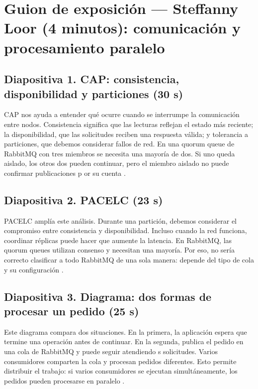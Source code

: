 
\section*{Guion de exposición — Steffanny Loor (4 minutos): comunicación y procesamiento paralelo}

\subsection*{Diapositiva 1. CAP: consistencia, disponibilidad y particiones (30 s)}
CAP nos ayuda a entender qué ocurre cuando se interrumpe la comunicación entre nodos.
Consistencia significa que las lecturas reflejan el estado más reciente;
la disponibilidad, que las solicitudes reciben una respuesta válida;
y tolerancia a particiones, que debemos considerar fallos de red.
 En una quorum queue de RabbitMQ con tres miembros se necesita una mayoría de dos.
 Si uno queda aislado, los otros dos pueden continuar, pero el miembro aislado no puede confirmar publicaciones p
 or su cuenta \cite{ahmed2023,myrhorodskyi2025,rabbitmq2026quorum}.

\subsection*{Diapositiva 2. PACELC (23 s)}
PACELC amplía este análisis.
Durante una partición, debemos considerar el compromiso entre
consistencia y disponibilidad. Incluso cuando la red funciona,
coordinar réplicas puede hacer que aumente la latencia.
En RabbitMQ, las quorum queues utilizan consenso y necesitan una mayoría.
 Por eso, no sería correcto clasificar a todo RabbitMQ de una sola manera:
 depende del tipo de cola y su configuración \cite{ahmed2023,myrhorodskyi2025,rabbitmq2026quorum}.

\subsection*{Diapositiva 3. Diagrama: dos formas de procesar un pedido (25 s)}
Este diagrama compara dos situaciones.
 En la primera, la aplicación espera que termine una
 operación antes de continuar. En la segunda, publica el
 pedido en una cola de RabbitMQ y puede seguir atendiendo s
 solicitudes. Varios consumidores comparten la cola y
 procesan pedidos diferentes. Esto permite distribuir el
 trabajo: si varios consumidores se ejecutan simultáneamente,
 los pedidos pueden procesarse en paralelo \cite{maharjan2023,derlatka2023,reinders2023}.

